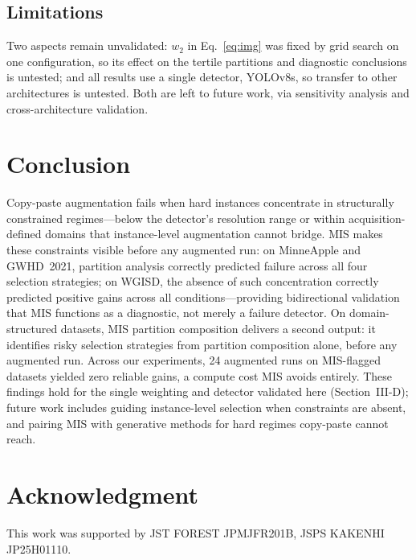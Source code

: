 \documentclass[conference,a4paper]{IEEEtran}
\begin{document}
\subsection{Limitations}
Two aspects remain unvalidated: $w_2$ in Eq.~\eqref{eq:img}
was fixed by grid search on one configuration, so its effect on
the tertile partitions and diagnostic conclusions is untested;
and all results use a single detector, YOLOv8s, so transfer to
other architectures is untested. Both are left to future work,
via sensitivity analysis and cross-architecture validation.

\section{Conclusion}

Copy-paste augmentation fails when hard instances concentrate
in structurally constrained regimes---below the detector's
resolution range or within acquisition-defined domains that
instance-level augmentation cannot bridge.
MIS makes these constraints visible before any augmented run:
on MinneApple and GWHD~2021, partition analysis correctly
predicted failure across all four selection strategies;
on WGISD, the absence of such concentration correctly
predicted positive gains across all conditions---providing
bidirectional validation that MIS functions as a diagnostic,
not merely a failure detector.
On domain-structured datasets, MIS partition composition
delivers a second output: it identifies risky selection
strategies from partition composition alone, before any
augmented run. Across our experiments, 24 augmented runs on MIS-flagged
datasets yielded zero reliable gains, a compute cost MIS
avoids entirely. These findings hold for the single weighting
and detector validated here (Section~III-D); future work
includes guiding instance-level selection when constraints are
absent, and pairing MIS with generative methods for hard
regimes copy-paste cannot reach.

\section*{Acknowledgment}
This work was supported by JST FOREST JPMJFR201B,
JSPS KAKENHI JP25H01110.
\end{document}

